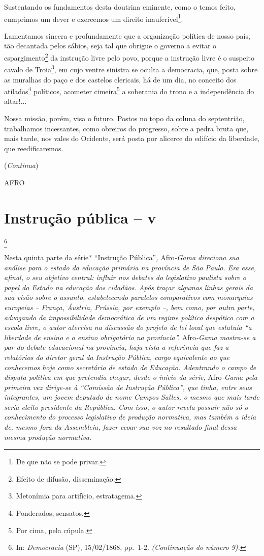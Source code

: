 Sustentando os fundamentos desta doutrina eminente, como o temos feito,
cumprimos um dever e exercemos um direito inauferível\footnote{De que
  não se pode privar.}.

Lamentamos sincera e profundamente que a organização política de nosso
país, tão decantada pelos sábios, seja tal que obrigue o governo a
evitar o espargimento\footnote{Efeito de difusão, disseminação.} da
instrução livre pelo povo, porque a instrução livre é o suspeito cavalo
de Troia\footnote{Metonímia para artifício, estratagema.}, em cujo
ventre sinistra se oculta a democracia, que, posta sobre as muralhas do
paço e dos castelos clericais, há de um dia, no conceito dos
atilados\footnote{Ponderados, sensatos.} políticos, acometer
cimeira\footnote{Por cima, pela cúpula.} a soberania do trono e a
independência do altar!...

Nossa missão, porém, visa o futuro. Postos no topo da coluna do
septentrião, trabalhamos incessantes, como obreiros do progresso, sobre
a pedra bruta que, mais tarde, nos vales do Ocidente, será posta por
alicerce do edifício da liberdade, que reedificaremos.

(\emph{Continua})

AFRO

\chapter{Instrução pública -- v}\footnote{In: \emph{Democracia} (SP),
  15/02/1868, pp.~1-2. \emph{(Continuação do número 9).}}

\begin{didascalia}
Nesta quinta parte da série* ``Instrução Pública''\emph{,} Afro\emph{-Gama
direciona sua análise para o estado da educação primária na província de
São Paulo. Era esse, afinal, o seu objetivo central: influir nos debates
do legislativo paulista sobre o papel do Estado na educação dos
cidadãos. Após traçar algumas linhas gerais da sua visão sobre o
assunto, estabelecendo paralelos comparativos com monarquias europeias
-- França, Áustria, Prússia, por exemplo --, bem como, por outra parte,
advogando da impossibilidade democrática de um regime político despótico
com a escola livre, o autor aterrisa na discussão do projeto de lei
local que estatuía ``a liberdade de ensino e o ensino obrigatório na
província''.} Afro\emph{-Gama mostra-se a par do debate educacional na
província, haja vista a referência que faz a relatórios do diretor geral
da Instrução Pública, cargo equivalente ao que conhecemos hoje como
secretário de estado de Educação. Adentrando o campo de disputa política
em que pretendia chegar, desde o início da série,} Afro\emph{-Gama pela
primeira vez dirige-se à ``Comissão de Instrução Pública'', que tinha,
entre seus integrantes, um jovem deputado de nome Campos Salles, o mesmo
que mais tarde seria eleito presidente da República. Com isso, o autor
revela possuir não só o conhecimento do processo legislativo de produção
normativa, mas também a ideia de, mesmo fora da Assembleia, fazer ecoar
sua voz no resultado final dessa mesma produção normativa.}
\end{didascalia}

